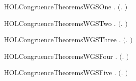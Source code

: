 \newcommand{\HOLCongruenceTheoremsWGXXstrongind}{\UseVerbatim{HOLCongruenceTheoremsWGXXstrongind}}
\begin{SaveVerbatim}{HOLCongruenceTheoremsWGSOne}
\HOLTokenTurnstile{} \HOLSymConst{\HOLTokenForall{}}.  \ensuremath{(}\HOLTokenLambda{}. \HOLSymConst{\ensuremath{\ldotp}}\ensuremath{)}
\end{SaveVerbatim}
\newcommand{\HOLCongruenceTheoremsWGSOne}{\UseVerbatim{HOLCongruenceTheoremsWGSOne}}
\begin{SaveVerbatim}{HOLCongruenceTheoremsWGSTwo}
\HOLTokenTurnstile{} \HOLSymConst{\HOLTokenForall{}}.  \ensuremath{(}\HOLTokenLambda{}. \ensuremath{)}
\end{SaveVerbatim}
\newcommand{\HOLCongruenceTheoremsWGSTwo}{\UseVerbatim{HOLCongruenceTheoremsWGSTwo}}
\begin{SaveVerbatim}{HOLCongruenceTheoremsWGSThree}
\HOLTokenTurnstile{} \HOLSymConst{\HOLTokenForall{}} .   \HOLSymConst{\HOLTokenImp{}}  \ensuremath{(}\HOLTokenLambda{}. \HOLSymConst{\ensuremath{\ldotp}} \ensuremath{)}
\end{SaveVerbatim}
\newcommand{\HOLCongruenceTheoremsWGSThree}{\UseVerbatim{HOLCongruenceTheoremsWGSThree}}
\begin{SaveVerbatim}{HOLCongruenceTheoremsWGSFour}
\HOLTokenTurnstile{} \HOLSymConst{\HOLTokenForall{}}   .
         \HOLSymConst{\HOLTokenConj{}}   \HOLSymConst{\HOLTokenImp{}}  \ensuremath{(}\HOLTokenLambda{}. \HOLSymConst{\ensuremath{\ldotp}}  \HOLSymConst{\ensuremath{+}} \HOLSymConst{\ensuremath{\ldotp}} \ensuremath{)}
\end{SaveVerbatim}
\newcommand{\HOLCongruenceTheoremsWGSFour}{\UseVerbatim{HOLCongruenceTheoremsWGSFour}}
\begin{SaveVerbatim}{HOLCongruenceTheoremsWGSFive}
\HOLTokenTurnstile{} \HOLSymConst{\HOLTokenForall{}} .   \HOLSymConst{\HOLTokenConj{}}   \HOLSymConst{\HOLTokenImp{}}  \ensuremath{(}\HOLTokenLambda{}.   \HOLSymConst{\ensuremath{\mid}}  \ensuremath{)}
\end{SaveVerbatim}
